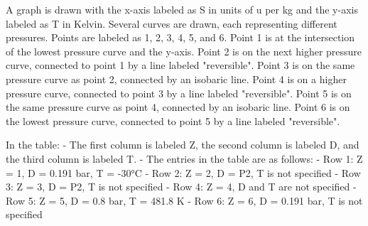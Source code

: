 A graph is drawn with the x-axis labeled as S in units of u per kg and the y-axis labeled as T in Kelvin. Several curves are drawn, each representing different pressures. Points are labeled as 1, 2, 3, 4, 5, and 6. Point 1 is at the intersection of the lowest pressure curve and the y-axis. Point 2 is on the next higher pressure curve, connected to point 1 by a line labeled "reversible". Point 3 is on the same pressure curve as point 2, connected by an isobaric line. Point 4 is on a higher pressure curve, connected to point 3 by a line labeled "reversible". Point 5 is on the same pressure curve as point 4, connected by an isobaric line. Point 6 is on the lowest pressure curve, connected to point 5 by a line labeled "reversible".

In the table:
- The first column is labeled Z, the second column is labeled D, and the third column is labeled T.
- The entries in the table are as follows:
  - Row 1: Z = 1, D = 0.191 bar, T = -30°C
  - Row 2: Z = 2, D = P2, T is not specified
  - Row 3: Z = 3, D = P2, T is not specified
  - Row 4: Z = 4, D and T are not specified
  - Row 5: Z = 5, D = 0.8 bar, T = 481.8 K
  - Row 6: Z = 6, D = 0.191 bar, T is not specified